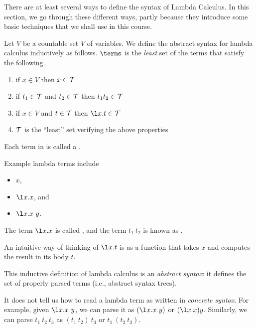 There are at least several ways to define the syntax of Lambda Calculus.
%
In this section, we go through these different ways, partly because they introduce some basic techniques that we shall use in this course.  

\begin{definition}
\label{def:lambda::syn::inductive}
Let $V$ be a countable set $V$ of variables.  We define the abstract
syntax for lambda calculus inductively as follows.
%
$\terms$ is the {\em least} set of the terms that satisfy the following.
\begin{enumerate}
\item{if $x\in V$ then $x\in {\cal T}$}
\item{if $t_1\in {\cal T}$ and $t_2\in {\cal T}$ then $t_1t_2\in {\cal T}$}
\item{if $x\in V$ and $t\in {\cal T}$ then $\l   x.t\in {\cal T}$}
\item{${\cal T}$ is the ``least'' set verifying the above properties}
\end{enumerate}

Each term in \terms is called a .  
\end{definition}

\begin{example}
\label{xrcs:lambda::syn::1} 
Example lambda terms include
\begin{itemize}
\item $x$,
\item $\l x.x$, and
\item $\l x.x~y$.  
\end{itemize}
\end{example}

\begin{definition}
\label{def:lambda::syn::abstraction}
The term $\l x.x$ is called ,
%
and the term $t_1~t_2$ is known as .
%

An intuitive way of thinking of $\l x.t$ is as a function that takes
$x$ and computes the result in its body $t$.
\end{definition}

\begin{gram}
\label{grm:lambda::syn::abs-and-conc} 
This inductive definition of lambda calculus is an \emph{abstract syntax}:
%
it defines the set of properly parsed terms (i.e., abstract syntax
trees).  
%

It does not tell us how to read a lambda term as written in
\emph{concrete syntax}.  
%
For example, given $\l x. x~y$, we can parse it as 
$(\l x.x~y)$ or $(\l x. x) y$.  
%
Similarly, we can parse $t_1~t_2~t_3$ as
$(t_1~t_2)~t_3$ or $t_1~(t_2~t_3)$.
\end{gram}

